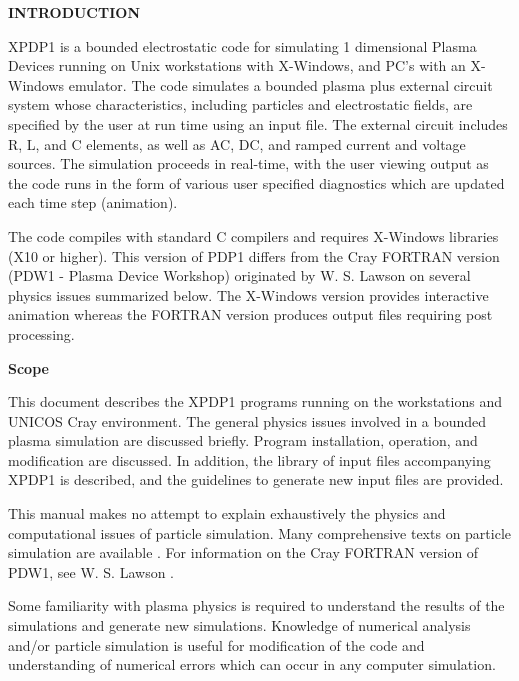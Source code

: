\begin{section}
{\bf INTRODUCTION}

XPDP1 is a bounded electrostatic code for simulating 1 dimensional Plasma
Devices running on Unix workstations with X-Windows, and PC's with an X-Windows
emulator.  The code simulates a bounded plasma plus external circuit system
whose characteristics, including particles and electrostatic fields, are
specified by the user at run time using an input file.  The external circuit
includes R, L, and C elements, as well as AC, DC, and ramped current and
voltage sources.  The simulation proceeds in real-time, with the user viewing
output as the code runs in the form of various user specified diagnostics which
are updated each time step (animation).
\vspace{0.1in}

\noindent
The code compiles with standard C compilers and requires X-Windows libraries
(X10 or higher).  This version of PDP1 differs from the Cray FORTRAN version
(PDW1 - Plasma Device Workshop) originated by W. S. Lawson on several physics
issues summarized below.  The X-Windows version provides interactive animation
whereas the FORTRAN version produces output files requiring post processing.

\begin{subsection}
{\bf Scope}

   This document describes the XPDP1 programs running on the workstations and
   UNICOS Cray environment.  The general physics issues involved in a bounded
   plasma simulation are discussed briefly.  Program installation, operation,
   and modification are discussed.  In addition, the library of input files
   accompanying XPDP1 is described, and the guidelines to generate new input
   files are provided.
\vspace{.2in}

\noindent
   This manual makes no attempt to explain exhaustively the physics and
   computational issues of particle simulation.  Many comprehensive texts on
   particle simulation are available \cite{kn:bird}\cite{kn:hock}.
   For information on the Cray FORTRAN
   version of PDW1, see W. S. Lawson \cite{kn:law}.
\vspace{.2in}

\noindent
   Some familiarity with plasma physics is required to understand the results
   of the simulations and generate new simulations.  Knowledge of numerical
   analysis and/or particle simulation is useful for modification of the code
   and understanding of numerical errors which can occur in any computer
   simulation.


\end{subsection}
\end{section}
